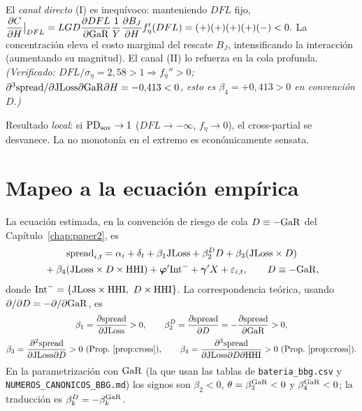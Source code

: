 \begin{remark}
El \emph{canal directo} (I) es inequívoco: manteniendo $DFL$ fijo,
$\dfrac{\partial C}{\partial H}\big|_{DFL}=LGD\dfrac{\partial DFL}{\partial\mathrm{GaR}}\dfrac1Y\dfrac{\partial B_J}{\partial H}f_\eta'(DFL)=(+)(+)(+)(+)(-)<0.$
La concentración eleva el costo marginal del rescate $B_J$, intensificando la interacción (aumentando su magnitud). El canal (II) lo refuerza en la cola profunda. \emph{(Verificado: $DFL/\sigma_\eta=2{,}58>1\Rightarrow f_\eta''>0$; $\partial^3\mathrm{spread}/\partial\mathrm{JLoss}\partial\mathrm{GaR}\partial H=-0{,}413<0$, esto es $\beta_4=+0{,}413>0$ en convención $D$.)}
\end{remark}

\begin{remark}[saturación]
Resultado \emph{local}: si $\mathrm{PD}_{\text{sov}}\to1$ ($DFL\to-\infty$, $f_\eta\to0$), el cross-partial se desvanece. La no monotonía en el extremo es económicamente sensata.
\end{remark}

\section{Mapeo a la ecuación empírica}\label{sec:map-A}

La ecuación estimada, en la convención de riesgo de cola $D\equiv-\mathrm{GaR}$ del Capítulo~\ref{chap:paper2}, es
\begin{multline*}
\mathrm{spread}_{i,t}=\alpha_i+\delta_t+\beta_1\mathrm{JLoss}+\beta_2^{D} D+\beta_3(\mathrm{JLoss}\times D)\\
{}+\beta_4(\mathrm{JLoss}\times D\times\mathrm{HHI})+\boldsymbol\varphi'\text{Int}^-+\boldsymbol\gamma'X+\varepsilon_{i,t},\qquad D\equiv-\mathrm{GaR},
\end{multline*}
donde $\text{Int}^-=\{\JLoss\times\HHI,\ D\times\HHI\}$. La correspondencia teórica, usando $\partial/\partial D=-\partial/\partial\mathrm{GaR}$, es
\begin{gather*}
\beta_1=\frac{\partial\Spread}{\partial\JLoss}>0,\qquad
\beta_2^{D}=\frac{\partial\Spread}{\partial D}=-\frac{\partial\Spread}{\partial\GaR}>0,\\[2pt]
\beta_3=\frac{\partial^2\Spread}{\partial\JLoss\partial D}>0\ (\text{Prop.~\ref{prop:cross}}),\qquad
\beta_4=\frac{\partial^3\Spread}{\partial\JLoss\partial D\partial\HHI}>0\ (\text{Prop.~\ref{prop:cross}}).
\end{gather*}
En la parametrización con $\mathrm{GaR}$ (la que usan las tablas de \texttt{bateria\_bbg.csv} y \texttt{NUMEROS\_CANONICOS\_BBG.md}) los signos son $\beta_2<0$, $\theta=\beta_3^{\mathrm{GaR}}<0$ y $\beta_4^{\mathrm{GaR}}<0$; la traducción es $\beta_k^{D}=-\beta_k^{\mathrm{GaR}}$.

